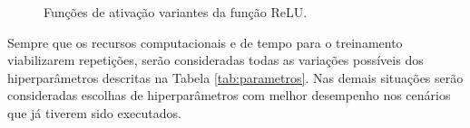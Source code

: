\begin{figure}[h!]
	\centering
	\caption{Funções de ativação variantes da função ReLU.}\label{fig:relu-variants}
	\hfill
\end{figure}

%
%

Sempre que os recursos computacionais e de tempo para o treinamento viabilizarem repetições, serão consideradas todas as variações possíveis dos hiperparâmetros descritas na Tabela \ref{tab:parametros}. Nas demais situações serão consideradas escolhas de hiperparâmetros com melhor desempenho nos cenários que já tiverem sido executados.
